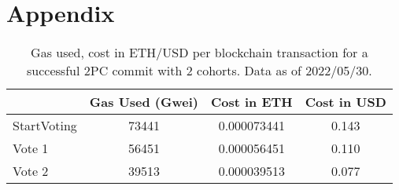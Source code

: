 \documentclass[11pt,conference]{IEEEtran}
\begin{document}
\section{Appendix} \label{appendix}
\begin{table}[hbtp]
  \centering
  \caption{Gas used, cost in ETH/USD per blockchain transaction for a successful 2PC commit with 2 cohorts. Data as of 2022/05/30.}
  \label{table:cost}
  \begin{tabular}{|l|c|c|c|}
    \hline
          & Gas Used (Gwei) &  Cost in ETH & Cost in USD \\
          \hline
    StartVoting &73441 &0.000073441 & 0.143\\
    \hline
    Vote 1 &56451	&0.000056451 &0.110\\
    \hline
    Vote 2 &39513 &0.000039513 &0.077\\
    \hline
  \end{tabular}
\end{table}
\end{document}
